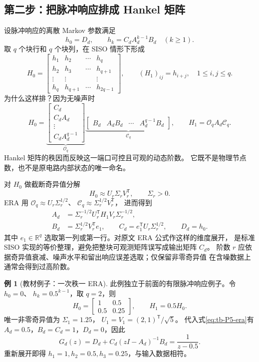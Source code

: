 \documentclass[UTF8,11pt,fontset=fandol,openany,oneside]{ctexbook}
\theoremstyle{definition}
\newtheorem{example}[theorem]{例}
\theoremstyle{remark}
\numberwithin{equation}{chapter}
\begin{document}
\subsection{第二步：把脉冲响应排成 Hankel 矩阵}
设脉冲响应的离散 Markov 参数满足
\[
 h_0=D_d,\qquad h_k=C_dA_d^{k-1}B_d\quad(k\ge1).
\]
取 $q$ 个块行和 $q$ 个块列，在 SISO 情形下形成
\[
 H_0=
 \begin{bmatrix}
 h_1&h_2&\cdots&h_q\\
 h_2&h_3&\cdots&h_{q+1}\\
 \vdots&\vdots&&\vdots\\
 h_q&h_{q+1}&\cdots&h_{2q-1}
 \end{bmatrix},\qquad
 (H_1)_{ij}=h_{i+j},\quad1\le i,j\le q .
\]
为什么这样排？因为无噪声时
\[
 H_0=\underbrace{\begin{bmatrix}C_d\\C_dA_d\\\vdots\\C_dA_d^{q-1}\end{bmatrix}}_{\mathcal O_q}
 \underbrace{\begin{bmatrix}B_d&A_dB_d&\cdots&A_d^{q-1}B_d\end{bmatrix}}_{\mathcal C_q},
 \qquad H_1=\mathcal O_q A_d\mathcal C_q.
\]
Hankel 矩阵的秩因而反映这一端口可控且可观的动态阶数。
它既不是物理节点数，也不是原电路内部状态的唯一命名。

对 $H_0$ 做截断奇异值分解
\[
 H_0\approx U_r\Sigma_rV_r^\mathsf T,\qquad \Sigma_r>0.
\]
ERA 用 $\mathcal O_q\approx U_r\Sigma_r^{1/2}$、
$\mathcal C_q\approx\Sigma_r^{1/2}V_r^\mathsf T$，
进而得到
\begin{equation}\label{eq:tb-P5-era}
 \begin{split}
 A_d&=\Sigma_r^{-1/2}U_r^\mathsf T H_1V_r\Sigma_r^{-1/2},\\
 B_d&=\Sigma_r^{1/2}V_r^\mathsf T e_1,\qquad
 C_d=e_1^\mathsf T U_r\Sigma_r^{1/2},\qquad D_d=h_0.
 \end{split}
\end{equation}
其中 $e_1\in\mathbb R^q$ 选取第一列或第一行。对原文 ERA 公式作这样的维度展开，
是标准 SISO 实现的等价整理，避免把整块可观测矩阵误写成输出矩阵 $C_d$。
阶数 $r$ 应依据奇异值衰减、噪声水平和留出响应误差选取；仅保留非零奇异值
在含噪数据上通常会得到过高阶数。

\begin{example}[教材例子：一次秩一 ERA]
此例独立于前面的有限脉冲响应例子。令 $h_0=0$、
$h_k=0.5^{k-1}$，取 $q=2$，则
\[
 H_0=\begin{bmatrix}1&0.5\\0.5&0.25\end{bmatrix},\qquad H_1=0.5H_0.
\]
唯一非零奇异值为 $\Sigma_1=1.25$，
$U_1=V_1=(2,1)^\mathsf T/\sqrt5$。
代入式\eqref{eq:tb-P5-era}有
$A_d=0.5$，$B_d=C_d=1$，$D_d=0$，因此
\[
 G_d(z)=D_d+C_d(zI-A_d)^{-1}B_d=\frac1{z-0.5}.
\]
重新展开即得 $h_1=1,h_2=0.5,h_3=0.25$，与输入数据相符。
\end{example}
\end{document}
